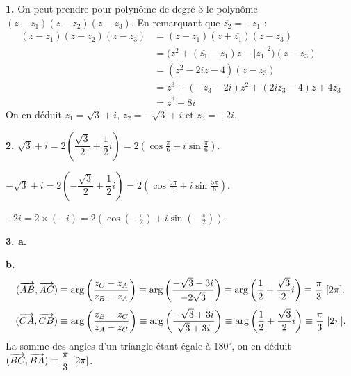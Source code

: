 \documentclass[11pt]{article}
\begin{document}

\textbf{1.} On peut prendre pour polynôme de degré 3 le polynôme $(z - z_1)(z - z_2)(z - z_3)$. En remarquant que $\overline{z_2} = -z_1$ :
\begin{align*}
(z - z_1)(z - z_2)(z - z_3) &= (z - z_1)(z + \overline{z_1})(z - z_3) \\
&= \big(z^2 + (\overline{z_1} - z_1)z - |z_1|^2\big)(z - z_3) \\
&= (z^2 - 2iz - 4)(z - z_3) \\
&= z^3 + (-z_3 - 2i)z^2 + (2iz_3 - 4)z + 4z_3 \\
&= z^3 - 8i
\end{align*}
On en déduit $z_1 = \sqrt{3} + i$, $z_2 = -\sqrt{3} + i$ et $z_3 = -2i$.

\textbf{2.} $\sqrt{3} + i = 2\left(\dfrac{\sqrt{3}}{2} + \dfrac{1}{2}i\right) = 2\left(\cos\tfrac{\pi}{6} + i\sin\tfrac{\pi}{6}\right)$.

$-\sqrt{3} + i = 2\left(-\dfrac{\sqrt{3}}{2} + \dfrac{1}{2}i\right) = 2\left(\cos\tfrac{5\pi}{6} + i\sin\tfrac{5\pi}{6}\right)$.

$-2i = 2 \times (-i) = 2\left(\cos\left(-\tfrac{\pi}{2}\right) + i\sin\left(-\tfrac{\pi}{2}\right)\right)$.

\textbf{3. a.}
\begin{center}
\end{center}

\textbf{b.}
\[ (\vv{AB}, \vv{AC}) \equiv \arg\left(\frac{z_C - z_A}{z_B - z_A}\right) \equiv \arg\left(\frac{-\sqrt{3} - 3i}{-2\sqrt{3}}\right) \equiv \arg\left(\frac{1}{2} + \frac{\sqrt{3}}{2}i\right) \equiv \frac{\pi}{3}\ [2\pi]. \]
\[ (\vv{CA}, \vv{CB}) \equiv \arg\left(\frac{z_B - z_C}{z_A - z_C}\right) \equiv \arg\left(\frac{-\sqrt{3} + 3i}{\sqrt{3} + 3i}\right) \equiv \arg\left(\frac{1}{2} + \frac{\sqrt{3}}{2}i\right) \equiv \frac{\pi}{3}\ [2\pi]. \]
La somme des angles d'un triangle étant égale à $180^\circ$, on en déduit $(\overrightarrow{BC}, \overrightarrow{BA}) \equiv \dfrac{\pi}{3}\ [2\pi]$.
\end{document}
